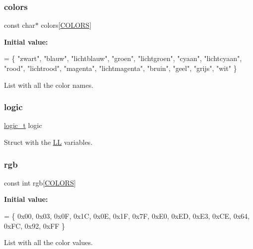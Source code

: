 \subsubsection{\texorpdfstring{colors}{colors}}
{\footnotesize\ttfamily const char$\ast$ colors\mbox{[}\mbox{\hyperlink{group___global_ga883046b8f0d1f6368a9b9eaf5ca36af3}{C\+O\+L\+O\+RS}}\mbox{]}}

{\bfseries Initial value\+:}
\begin{DoxyCode}
=
\{ \textcolor{stringliteral}{"zwart"}, \textcolor{stringliteral}{"blauw"}, \textcolor{stringliteral}{"lichtblauw"}, \textcolor{stringliteral}{"groen"}, \textcolor{stringliteral}{"lichtgroen"}, \textcolor{stringliteral}{"cyaan"},
        \textcolor{stringliteral}{"lichtcyaan"}, \textcolor{stringliteral}{"rood"}, \textcolor{stringliteral}{"lichtrood"}, \textcolor{stringliteral}{"magenta"}, \textcolor{stringliteral}{"lichtmagenta"},
        \textcolor{stringliteral}{"bruin"}, \textcolor{stringliteral}{"geel"}, \textcolor{stringliteral}{"grijs"}, \textcolor{stringliteral}{"wit"} \}
\end{DoxyCode}


List with all the color names. 

\mbox{\label{namespace_l_l_ac675f1a7fd8efbaf36d511424a5f24ce}} 
\subsubsection{\texorpdfstring{logic}{logic}}
{\footnotesize\ttfamily \mbox{\hyperlink{struct_l_l_1_1logic__t}{logic\+\_\+t}} logic}



Struct with the \mbox{\hyperlink{namespace_l_l}{LL}} variables. 

\mbox{\label{namespace_l_l_a49c70cdbac1a1c4df4224875018c75b4}} 
\subsubsection{\texorpdfstring{rgb}{rgb}}
{\footnotesize\ttfamily const int rgb\mbox{[}\mbox{\hyperlink{group___global_ga883046b8f0d1f6368a9b9eaf5ca36af3}{C\+O\+L\+O\+RS}}\mbox{]}}

{\bfseries Initial value\+:}
\begin{DoxyCode}
=
\{ 0x00, 0x03, 0x0F, 0x1C, 0x0E, 0x1F, 0x7F, 0xE0, 0xED, 0xE3, 0xCE, 0x64,
        0xFC, 0x92, 0xFF \}
\end{DoxyCode}


List with all the color values. 

